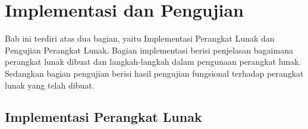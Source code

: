 \chapter{Implementasi dan Pengujian}
\label{sec: Implementasi dan Pengujian}

Bab ini terdiri atas dua bagian, yaitu Implementasi Perangkat Lunak dan Pengujian Perangkat Lunak. Bagian implementasi berisi penjelasan bagaimana perangkat lunak dibuat dan langkah-langkah dalam pengunaan perangkat lunak. Sedangkan bagian pengujian berisi hasil pengujian fungsional terhadap perangkat lunak yang telah dibuat.
\section{Implementasi Perangkat Lunak}
\label{sec: Implementasi Perangkat Lunak}

